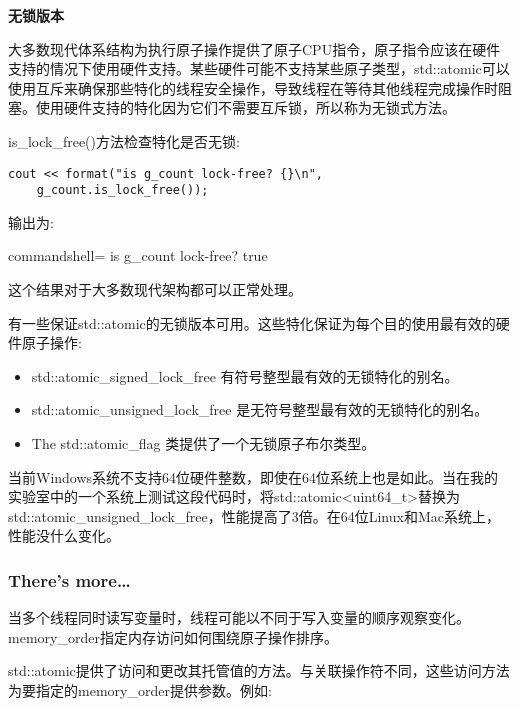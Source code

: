 \noindent
\textbf{无锁版本}

大多数现代体系结构为执行原子操作提供了原子CPU指令，原子指令应该在硬件支持的情况下使用硬件支持。某些硬件可能不支持某些原子类型，std::atomic可以使用互斥来确保那些特化的线程安全操作，导致线程在等待其他线程完成操作时阻塞。使用硬件支持的特化因为它们不需要互斥锁，所以称为无锁式方法。

is\_lock\_free()方法检查特化是否无锁:

\begin{lstlisting}[style=styleCXX]
cout << format("is g_count lock-free? {}\n",
	g_count.is_lock_free());
\end{lstlisting}

输出为:

\begin{tcblisting}{commandshell={}}
is g_count lock-free? true
\end{tcblisting}

这个结果对于大多数现代架构都可以正常处理。

有一些保证std::atomic的无锁版本可用。这些特化保证为每个目的使用最有效的硬件原子操作:

\begin{itemize}
\item 
std::atomic\_signed\_lock\_free 有符号整型最有效的无锁特化的别名。

\item 
std::atomic\_unsigned\_lock\_free 是无符号整型最有效的无锁特化的别名。

\item 
The std::atomic\_flag 类提供了一个无锁原子布尔类型。
\end{itemize}

\begin{tcolorbox}[colback=webgreen!5!white,colframe=webgreen!75!black,title=重要的Note]
当前Windows系统不支持64位硬件整数，即使在64位系统上也是如此。当在我的实验室中的一个系统上测试这段代码时，将std::atomic<uint64\_t>替换为std::atomic\_unsigned\_lock\_free，性能提高了3倍。在64位Linux和Mac系统上，性能没什么变化。
\end{tcolorbox}

\subsubsection{There's more…}

当多个线程同时读写变量时，线程可能以不同于写入变量的顺序观察变化。memory\_order指定内存访问如何围绕原子操作排序。

std::atomic提供了访问和更改其托管值的方法。与关联操作符不同，这些访问方法为要指定的memory\_order提供参数。例如:

